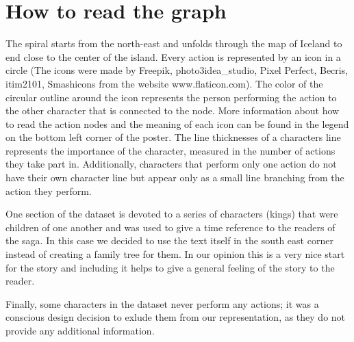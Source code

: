 \documentclass[runningheads]{llncs}
\begin{document}
\section{How to read the graph}

The spiral starts from the north-east and unfolds through the map of Iceland to end close to the center of the island. Every action is represented by an icon in a circle (The icons were made by Freepik, photo3idea\_studio, Pixel Perfect, Becris, itim2101, Smashicons from the website www.flaticon.com). The color of the circular outline around the icon represents the person performing the action to the other character that is connected to the node. More information about how to read the action nodes and the meaning of each icon can be found in the legend on the bottom left corner of the poster. The line thicknesses of a characters line represents the importance of the character, measured in the number of actions they take part in. Additionally, characters that perform only one action do not have their own character line but appear only as a small line branching from the action they perform. 

One section of the dataset is devoted to a series of characters (kings) that were children of one another and was used to give a time reference to the readers of the saga. In this case we decided to use the text itself in the south east corner instead of creating a family tree for them. In our opinion this is a very nice start for the story and including it helps to give a general feeling of the story to the reader.

Finally, some characters in the dataset never perform any actions; it was a conscious design decision to exlude them from our representation, as they do not provide any additional information.




%
%
%
% 
% 
%
%
\end{document}
